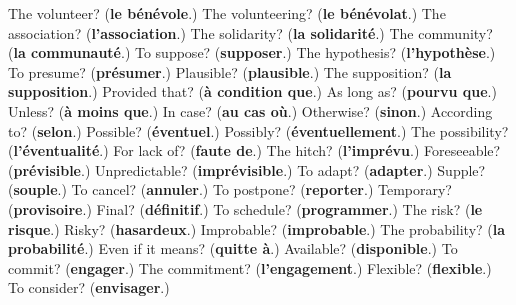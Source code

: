 \begin{tcolorbox}[breakable,colback=teal!4,colframe=teal!35!black,title={Before you move on}]
The volunteer? (\textbf{le bénévole}.) The volunteering? (\textbf{le bénévolat}.) The association? (\textbf{l'association}.) The solidarity? (\textbf{la solidarité}.) The community? (\textbf{la communauté}.) To suppose? (\textbf{supposer}.) The hypothesis? (\textbf{l'hypothèse}.) To presume? (\textbf{présumer}.) Plausible? (\textbf{plausible}.) The supposition? (\textbf{la supposition}.) Provided that? (\textbf{à condition que}.) As long as? (\textbf{pourvu que}.) Unless? (\textbf{à moins que}.) In case? (\textbf{au cas où}.) Otherwise? (\textbf{sinon}.) According to? (\textbf{selon}.) Possible? (\textbf{éventuel}.) Possibly? (\textbf{éventuellement}.) The possibility? (\textbf{l'éventualité}.) For lack of? (\textbf{faute de}.) The hitch? (\textbf{l'imprévu}.) Foreseeable? (\textbf{prévisible}.) Unpredictable? (\textbf{imprévisible}.) To adapt? (\textbf{adapter}.) Supple? (\textbf{souple}.) To cancel? (\textbf{annuler}.) To postpone? (\textbf{reporter}.) Temporary? (\textbf{provisoire}.) Final? (\textbf{définitif}.) To schedule? (\textbf{programmer}.) The risk? (\textbf{le risque}.) Risky? (\textbf{hasardeux}.) Improbable? (\textbf{improbable}.) The probability? (\textbf{la probabilité}.) Even if it means? (\textbf{quitte à}.) Available? (\textbf{disponible}.) To commit? (\textbf{engager}.) The commitment? (\textbf{l'engagement}.) Flexible? (\textbf{flexible}.) To consider? (\textbf{envisager}.)
\end{tcolorbox}

